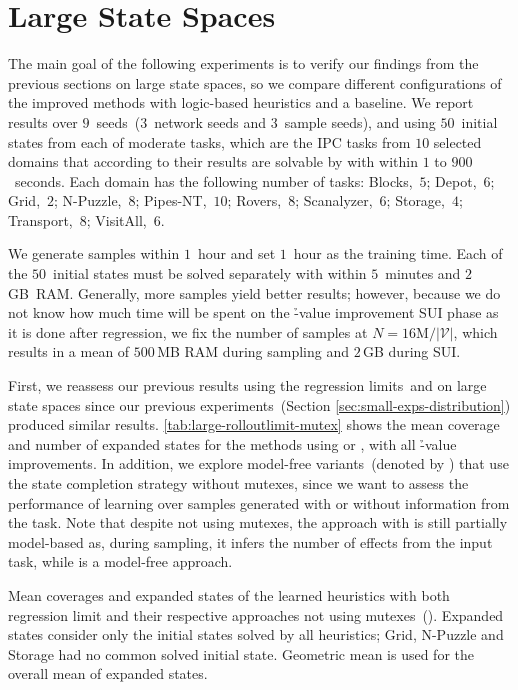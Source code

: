 \section{Large State Spaces}
\label{sec:large-experiments}

The main goal of the following experiments is to verify our findings from the previous sections on large state spaces, so we compare different configurations of the improved methods with logic-based heuristics and a baseline. We report results over $9$~seeds~($3$~network seeds and $3$~sample seeds), and using $50$~initial states from each of \citet{ferber2022neural} moderate tasks, which are the IPC tasks from $10$ selected domains that according to their results are solvable by \gbfs with \hff within $1$ to $900$~seconds. Each domain has the following number of tasks: Blocks,~$5$; Depot,~$6$; Grid,~$2$; N-Puzzle,~$8$; Pipes-NT,~$10$; Rovers,~$8$; Scanalyzer,~$6$; Storage,~$4$; Transport,~$8$; VisitAll,~$6$.

We generate samples within $1$~hour and set $1$~hour as the training time. Each of the $50$~initial states must be solved separately with \gbfs within $5$~minutes and $2$\,GB~RAM. Generally, more samples yield better results; however, because we do not know how much time will be spent on the \h-value improvement SUI phase as it is done after regression, we fix the number of samples at $N = 16\text{M} / |\mathcal{V}|$, which results in a mean of $500$\,MB RAM during sampling and $2$\,GB during SUI.

First, we reassess our previous results using the regression limits~\rlfacts and \rlmeanfx on large state spaces since our previous experiments~(Section \ref{sec:small-exps-distribution}) produced similar results. \cref{tab:large-rolloutlimit-mutex} shows the mean coverage and number of expanded states for the methods using \rlfacts or \rlmeanfx, with all \h-value improvements. In addition, we explore model-free variants~(denoted by \hnnnomutex) that use the state completion strategy without mutexes, since we want to assess the performance of learning over samples generated with or without information from the task. Note that despite not using mutexes, the approach with \hnnnomutexl{\rlmeanfx} is still partially model-based as, during sampling, it infers the number of effects from the input task\rv{!!!}, while \hnnnomutexl{\rlfacts} is a model-free approach.

\begin{table}[tb]
    \caption[Results of the learned heuristics with and without mutexes.]{Mean coverages and expanded states of the learned heuristics with both regression limit and their respective approaches not using mutexes~(\hnnnomutex). Expanded states consider only the initial states solved by all heuristics; Grid, N-Puzzle and Storage had no common solved initial state. Geometric mean is used for the overall mean of expanded states.}
    \label{tab:large-rolloutlimit-mutex}
    \addmargin
    \centering
    
\end{table}

